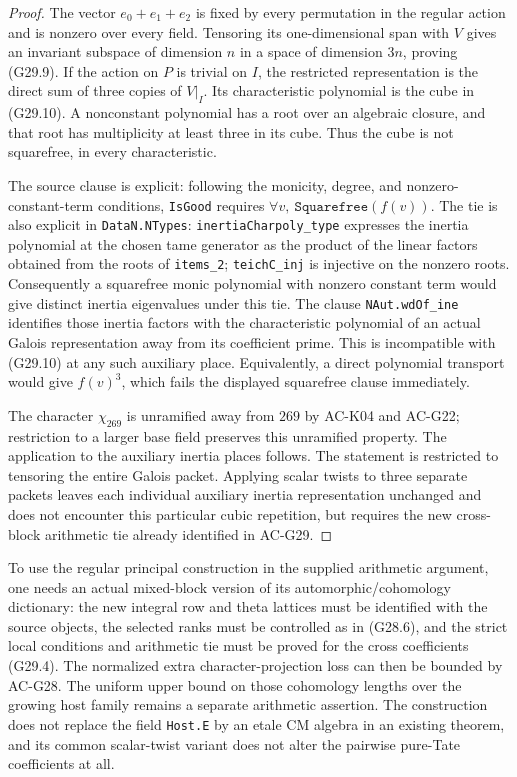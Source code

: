 \begin{proof}
The vector $e_0+e_1+e_2$ is fixed by every permutation in
the regular action and is nonzero over every field.
Tensoring its one-dimensional span with $V$ gives an
invariant subspace of dimension $n$ in a space of
dimension $3n$, proving (G29.9).
If the action on $P$ is trivial on $I$, the restricted
representation is the direct sum of three copies of
$V|_I$.  Its characteristic polynomial is the cube in
(G29.10).  A nonconstant polynomial has a root over an
algebraic closure, and that root has multiplicity at least
three in its cube.  Thus the cube is not squarefree,
in every characteristic.

The source clause is explicit: following the monicity,
degree, and nonzero-constant-term conditions, \texttt{IsGood}
requires $\forall v,\ \texttt{Squarefree}(f(v))$.
The tie is also explicit in \texttt{DataN.NTypes}:
\texttt{inertiaCharpoly\_type} expresses the inertia
polynomial at the chosen tame generator as the product
of the linear factors obtained from the roots of
\texttt{items\_2}; \texttt{teichC\_inj} is injective on
the nonzero roots.  Consequently a squarefree monic
polynomial with nonzero constant term would give distinct
inertia eigenvalues under this tie.
The clause \texttt{NAut.wdOf\_ine} identifies those
inertia factors with the characteristic polynomial of an
actual Galois representation away from its coefficient
prime.  This is incompatible with (G29.10) at any such
auxiliary place.  Equivalently, a direct polynomial
transport would give $f(v)^3$, which fails the displayed
squarefree clause immediately.

The character $\chi_{269}$ is unramified away from $269$
by AC-K04 and AC-G22; restriction to a larger base field
preserves this unramified property.  The application to
the auxiliary inertia places follows.  The statement is
restricted to tensoring the entire Galois packet.  Applying
scalar twists to three separate packets leaves each
individual auxiliary inertia representation unchanged
and does not encounter this particular cubic repetition,
but requires the new cross-block arithmetic tie already
identified in AC-G29.
\end{proof}

\begin{remark}
To use the regular principal construction in the supplied
arithmetic argument, one needs an actual mixed-block version
of its automorphic/cohomology dictionary: the new integral
row and theta lattices must be identified with the source
objects, the selected ranks must be controlled as in
(G28.6), and the strict local conditions and arithmetic tie
must be proved for the cross coefficients (G29.4).
The normalized extra character-projection loss can then be
bounded by AC-G28.  The uniform upper bound on those
cohomology lengths over the growing host family remains
a separate arithmetic assertion.  The construction does
not replace the field \texttt{Host.E} by an etale CM algebra
in an existing theorem, and its common scalar-twist variant
does not alter the pairwise pure-Tate coefficients at all.
\end{remark}

